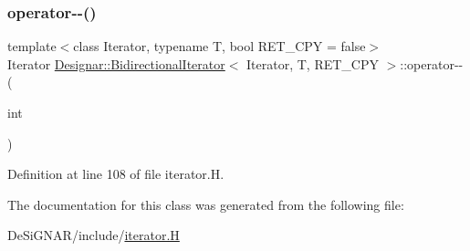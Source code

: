 \subsubsection{\texorpdfstring{operator-\/-\/()}{operator--()}\hspace{0.1cm}{\footnotesize\ttfamily [2/2]}}
{\footnotesize\ttfamily template$<$class Iterator, typename T, bool R\+E\+T\+\_\+\+C\+PY = false$>$ \\
Iterator \hyperlink{class_designar_1_1_bidirectional_iterator}{Designar\+::\+Bidirectional\+Iterator}$<$ Iterator, T, R\+E\+T\+\_\+\+C\+PY $>$\+::operator-\/-\/ (\begin{DoxyParamCaption}\item[{int}]{ }\end{DoxyParamCaption})\hspace{0.3cm}{\ttfamily [inline]}}



Definition at line 108 of file iterator.\+H.



The documentation for this class was generated from the following file\+:\begin{DoxyCompactItemize}
\item 
De\+Si\+G\+N\+A\+R/include/\hyperlink{iterator_8_h}{iterator.\+H}\end{DoxyCompactItemize}
